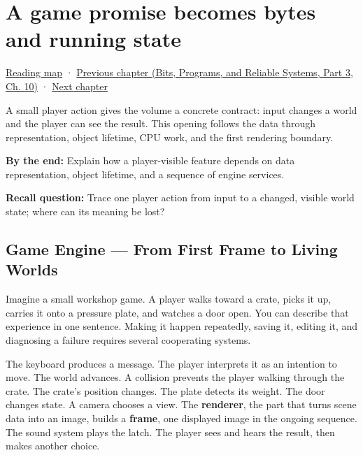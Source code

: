 \chapter{A game promise becomes bytes and running state}\label{05-engine-i-ch001-a-game-promise-becomes-bytes-and-running-state}\hypertarget{05-engine-i-ch001}{}\label{stagechapter:05-engine-i-ch001}

\hypertarget{05-engine-i-ch001-a-game-promise-becomes-bytes-and-running-state}{}

\hyperref[volume-reading-map]{Reading map} · \href{../01-Bits-Programs-and-Reliable-Systems-P03/main.pdf\#nameddest=01-foundations-i-ch012}{Previous chapter (Bits, Programs, and Reliable Systems, Part 3, Ch. 10)} · \hyperref[05-engine-i-ch002-how-bytes-become-programs-objects-and-resource-references]{Next chapter}

A small player action gives the volume a concrete contract: input changes a world and the player can see the result. This opening follows the data through representation, object lifetime, CPU work, and the first rendering boundary.

\textbf{By the end:} Explain how a player-visible feature depends on data representation, object lifetime, and a sequence of engine services.

\textbf{Recall question:} Trace one player action from input to a changed, visible world state; where can its meaning be lost?

\section{Game Engine --- From First Frame to Living Worlds}\label{05-engine-i-ch001-game-engine-from-first-frame-to-living-worlds}

\hypertarget{05-engine-i-ch001-game-engine-from-first-frame-to-living-worlds}{}

Imagine a small workshop game. A player walks toward a crate, picks it up, carries it onto a pressure plate, and watches a door open. You can describe that experience in one sentence. Making it happen repeatedly, saving it, editing it, and diagnosing a failure requires several cooperating systems.

The keyboard produces a message. The player interprets it as an intention to move. The world advances. A collision prevents the player walking through the crate. The crate's position changes. The plate detects its weight. The door changes state. A camera chooses a view. The \textbf{renderer}, the part that turns scene data into an image, builds a \textbf{frame}, one displayed image in the ongoing sequence. The sound system plays the latch. The player sees and hears the result, then makes another choice.

